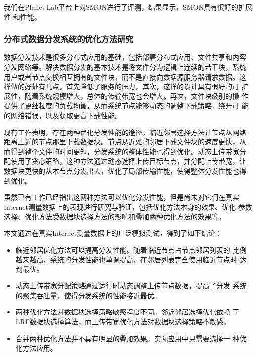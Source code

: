 我们在Planet-Lab平台上对SMON进行了评测，结果显示，SMON具有很好的扩展性
和性能。

\subsubsection*{分布式数据分发系统的优化方法研究}

数据分发技术是很多分布式应用的基础，包括部署分布式应用、文件共享和内容
分发网络等。解决数据分发的基本技术是将文件分为逻辑上连续的若干块，系统
用户或者节点交换相互拥有的文件块，而不是直接向数据源服务器请求数据。这
样做的好处有几点，首先降低了服务的压力，其次，这样的设计具有很好的可
扩展性，随着系统规模增大，总体的传输带宽也会增大。再次，文件块级别的操
作提供了更细粒度的负载均衡，从而系统节点能够动态的调整下载策略，绕开可
能的网络错误，以及获取更高下载性能。

现有工作表明，存在两种优化分发性能的途径。临近邻居选择方法让节点从网络
距离上近的节点那里下载数据块。节点从近处的邻居下载文件块的速度更快，从
而得到整个文件的时间更短，分发系统的整体性能也得到优化。动态上传带宽分
配使用了贪心策略，这种方法通过动态选择上传目标节点，并分配上传带宽，让
数据块更快的从本节点分发出去，优化了局部传输性能，使得整体分发性能也得
到优化。

虽然已有工作已经指出这两种方法可以优化分发性能，但是尚未对它们在真实
Internet测量数据上的表现进行研究与验证，包括优化方法本身的效果、优化
参数选择、优化方法受数据块选择方法的影响和叠加两种优化方法的效果等。


本文通过在真实Internet测量数据上的广泛模拟测试，得到了如下结论：

\begin{itemize}

  \item 临近邻居优化方法可以提高分发性能。随着临近节点占节点邻居列表的
  比例越来越高，系统的分发性能也单调提高，在邻居列表完全使用临近节点时
  达到最优。

  \item 动态上传带宽分配策略通过运行时动态调整上传节点数据，提高了分发
  系统的聚集吞吐量，使得分发系统的性能接近最优。

  \item 两种优化方法对数据块选择策略敏感程度不同。邻近邻居选择优化依赖
  于LRF数据块选择算法，而上传带宽优化方法对数据块选择策略不敏感。

  \item 合并两种优化方法并不具有明显的叠加效果。实际应用中只需要选择一
  种优化方法应用。

\end{itemize}



